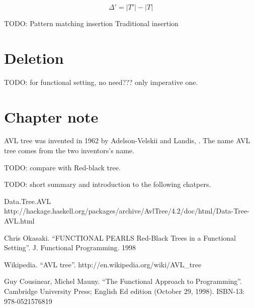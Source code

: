 \documentclass{article}
\begin{document}
\[
  \Delta' = |T'| - |T|
\]




TODO:
  Pattern matching insertion
  Traditional insertion
 

\section{Deletion}

  TODO: for functional setting, no need??? only imperative one.


\section{Chapter note}
AVL tree was invented in 1962 by Adelson-Velskii and Landis\cite{wiki}, 
\cite{TFATP}. The name AVL tree comes from the two inventors's name.

TODO: compare with Red-black tree.

  TODO: short summary and introduction to the following chatpers.

\begin{thebibliography}{99}

Data.Tree.AVL http://hackage.haskell.org/packages/archive/AvlTree/4.2/doc/html/Data-Tree-AVL.html

Chris Okasaki. ``FUNCTIONAL PEARLS Red-Black Trees in a Functional Setting''. J. Functional Programming. 1998

Wikipedia. ``AVL tree''. http://en.wikipedia.org/wiki/AVL\_tree

Guy Cousinear, Michel Mauny. ``The Functional Approach to Programming''. Cambridge University Press; English Ed edition (October 29, 1998). ISBN-13: 978-0521576819

\end{thebibliography}

\ifx\wholebook\relax\else
\end{document}
